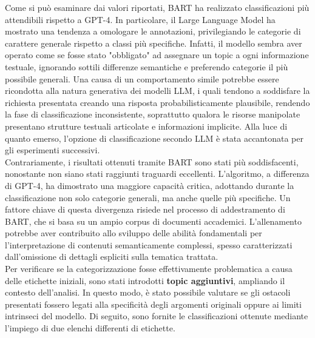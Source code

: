 Come si può esaminare dai valori riportati, BART ha realizzato classificazioni più attendibili rispetto a GPT-4. In particolare, il Large Language Model ha mostrato una tendenza a omologare le annotazioni, privilegiando le categorie di carattere generale rispetto a classi più specifiche. Infatti, il modello sembra aver operato come se fosse stato "obbligato" ad assegnare un topic a ogni informazione testuale, ignorando sottili differenze semantiche e preferendo categorie il più possibile generali. Una causa di un comportamento simile potrebbe essere ricondotta alla natura generativa dei modelli LLM, i quali tendono a soddisfare la richiesta presentata creando una risposta probabilisticamente plausibile, rendendo la fase di classificazione inconsistente, soprattutto qualora le risorse manipolate presentano strutture testuali articolate e informazioni implicite. Alla luce di quanto emerso, l'opzione di classificazione secondo LLM è stata accantonata per gli esperimenti successivi. \vspace{7pt} \\
Contrariamente, i risultati ottenuti tramite BART sono stati più soddisfacenti, nonostante non siano stati raggiunti traguardi eccellenti. L'algoritmo, a differenza di GPT-4, ha dimostrato una maggiore capacità critica, adottando durante la classificazione non solo categorie generali, ma anche quelle più specifiche. Un fattore chiave di questa divergenza risiede nel processo di addestramento di BART, che si basa su un ampio corpus di documenti accademici. L'allenamento potrebbe aver contribuito allo sviluppo delle abilità fondamentali per l'interpretazione di contenuti semanticamente complessi, spesso caratterizzati dall'omissione di dettagli espliciti sulla tematica trattata. \vspace{7pt} \\
Per verificare se la categorizzazione fosse effettivamente problematica a causa delle etichette iniziali, sono stati introdotti \textbf{topic aggiuntivi}, ampliando il contesto dell'analisi. In questo modo, è stato possibile valutare se gli ostacoli presentati fossero legati alla specificità degli argomenti originali oppure ai limiti intrinseci del modello. Di seguito, sono fornite le classificazioni ottenute mediante l'impiego di due elenchi differenti di etichette. 
